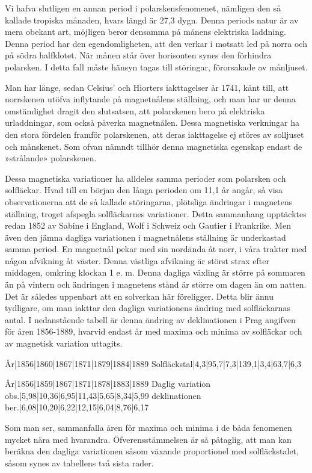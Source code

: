 \documentclass[a4paper, 12pt, oneside, swedish]{article}
\begin{document}
Vi hafva slutligen en annan period i polarskensfenomenet, nämligen den så kallade tropiska månaden, hvars längd är 27,3 dygn. Denna periods natur är av mera obekant art, möjligen beror densamma på månens elektriska laddning. Denna period har den egendomligheten, att den verkar i motsatt led på norra och på södra halfklotet. När månen står över horisonten synes den förhindra polarsken. I detta fall måste hänsyn tagas till störingar, förorsakade av månljuset.

Man har länge, sedan Celsius' och Hiorters iakttagelser år 1741, känt till, att norrskenen utöfva inflytande på magnetnålens ställning, och man har ur denna omständighet dragit den slutsatsen, att polarskenen bero på elektriska urladdningar, som också påverka magnetnålen. Dessa magnetiska verkningar ha den stora fördelen framför polarskenen, att deras iakttagelse ej störes av solljuset och månskenet. Som ofvan nämndt tillhör denna magnetiska egenskap endast de »strålande» polarskenen.

Dessa magnetiska variationer ha alldeles samma perioder som polarsken och solfläckar. Hvad till en början den långa perioden om 11,1 år angår, så visa observationerna att de så kallade störingarna, plötsliga ändringar i magnetens ställning, troget afspegla solfläckarnes variationer. Detta sammanhang upptäcktes redan 1852 av Sabine i England, Wolf i Schweiz och Gautier i Frankrike. Men även den jämna dagliga variationen i magnetnålens ställning är underkastad samma period. En magnetnål pekar med sin nordända åt norr, i våra trakter med någon afvikning åt väster. Denna västliga afvikning är störst strax efter middagen, omkring klockan 1 e. m. Denna dagliga växling är större på sommaren än på vintern och ändringen i magnetens stånd är större om dagen än om natten. Det är således uppenbart att en solverkan här föreligger. Detta blir ännu tydligare, om man iakttar den dagliga variationens ändring med solfläckarnas antal. I nedanstående tabell är denna ändring av deklinationen i Prag angifven för åren 1856-1889, hvarvid endast år med maxima och minima av solfläckar och av magnetisk variation uttagits.

År|1856|1860|1867|1871|1879|1884|1889  
Solfläckstal|4,3|95,7|7,3|139,1|3,4|63,7|6,3  

År|1856|1859|1867|1871|1878|1883|1889  
Daglig variation obs.|5,98|10,36|6,95|11,43|5,65|8,34|5,99  
deklinationen ber.|6,08|10,20|6,22|12,15|6,04|8,76|6,17  

Som man ser, sammanfalla åren för maxima och minima i de båda fenomenen mycket nära med hvarandra. Öfverensstämmelsen är så påtaglig, att man kan beräkna den dagliga variationen såsom växande proportionel med solfläckstalet, såsom synes av tabellens två sista rader.
\end{document}
